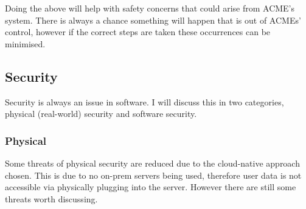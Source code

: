   Doing the above will help with safety concerns that could arise from ACME's system. There is always a chance something will happen that is out of 
  ACMEs' control, however if the correct steps are taken these occurrences can be minimised.

  \subsection{Security}
  Security is always an issue in software. I will discuss this in two categories, physical (real-world) security and software security.

  \subsubsection{Physical}
  \vspace{0.2cm}
  Some threats of physical security are reduced due to the cloud-native approach chosen. This is due to no on-prem servers being used, therefore 
  user data is not accessible via physically plugging into the server. However there are still some threats worth discussing.

